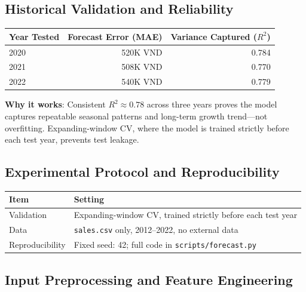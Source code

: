 \documentclass[12pt,a4paper]{article}
\begin{document}
\subsection{Historical Validation and Reliability}
\label{sec:historical-validation}

\begin{center}
\centering
{}
\label{tab:historical-validation}
\small
\begin{tabular}{lrr}
\toprule
\textbf{Year Tested} & \textbf{Forecast Error (MAE)} & \textbf{Variance Captured ($R^2$)} \\
\midrule
2020 & 520K VND & 0.784 \\
2021 & 508K VND & 0.770 \\
2022 & 540K VND & 0.779 \\
\bottomrule
\end{tabular}
\end{center}

\noindent\textbf{Why it works}: Consistent $R^2 \approx 0.78$ across three years proves the model captures repeatable seasonal patterns and long-term growth trend---not overfitting. Expanding-window CV, where the model is trained strictly before each test year, prevents test leakage.

\subsection{Experimental Protocol and Reproducibility}
\label{sec:protocol-reproducibility}

\begin{center}
\centering
{}
\label{tab:protocol-reproducibility}
\small
\begin{tabular}{p{3.5cm}p{10cm}}
\toprule
\textbf{Item} & \textbf{Setting} \\
\midrule
Validation & Expanding-window CV, trained strictly before each test year \\
Data & \texttt{sales.csv} only, 2012--2022, no external data \\
Reproducibility & Fixed seed: 42; full code in \texttt{scripts/forecast.py} \\
\bottomrule
\end{tabular}
\end{center}

\subsection{Input Preprocessing and Feature Engineering}
\label{sec:preprocessing-feature-engineering}
\end{document}
